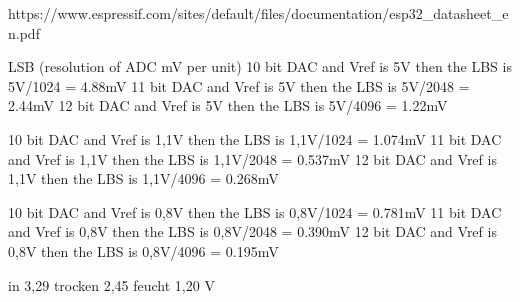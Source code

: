 https://www.espressif.com/sites/default/files/documentation/esp32_datasheet_en.pdf

LSB (resolution of ADC mV per unit)
10 bit DAC and Vref is 5V then the LBS is 5V/1024 = 4.88mV
11 bit DAC and Vref is 5V then the LBS is 5V/2048 = 2.44mV
12 bit DAC and Vref is 5V then the LBS is 5V/4096 = 1.22mV

10 bit DAC and Vref is 1,1V then the LBS is 1,1V/1024 = 1.074mV
11 bit DAC and Vref is 1,1V then the LBS is 1,1V/2048 = 0.537mV
12 bit DAC and Vref is 1,1V then the LBS is 1,1V/4096 = 0.268mV

10 bit DAC and Vref is 0,8V then the LBS is 0,8V/1024 = 0.781mV
11 bit DAC and Vref is 0,8V then the LBS is 0,8V/2048 = 0.390mV
12 bit DAC and Vref is 0,8V then the LBS is 0,8V/4096 = 0.195mV


in 3,29
trocken 2,45
feucht 1,20 V
